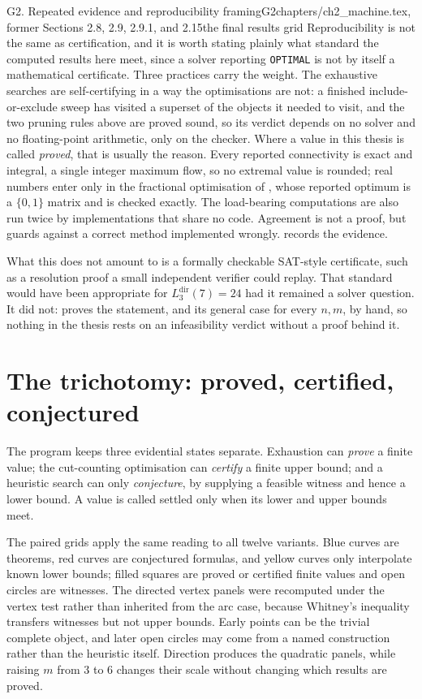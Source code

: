\begin{offcutrewrite}{G2. Repeated evidence and reproducibility framing}{G2}{chapters/ch2\_machine.tex, former Sections 2.8, 2.9, 2.9.1, and 2.15}{the final results grid}
Reproducibility is not the same as certification, and it is worth stating plainly what standard the computed results here meet, since a solver reporting \texttt{OPTIMAL} is not by itself a mathematical certificate. Three practices carry the weight. The exhaustive searches are self-certifying in a way the optimisations are not: a finished include-or-exclude sweep has visited a superset of the objects it needed to visit, and the two pruning rules above are proved sound, so its verdict depends on no solver and no floating-point arithmetic, only on the checker. Where a value in this thesis is called \emph{proved}, that is usually the reason. Every reported connectivity is exact and integral, a single integer maximum flow, so no extremal value is rounded; real numbers enter only in the fractional optimisation of , whose reported optimum is a $\{0,1\}$ matrix and is checked exactly. The load-bearing computations are also run twice by implementations that share no code. Agreement is not a proof, but guards against a correct method implemented wrongly.  records the evidence.

What this does not amount to is a formally checkable SAT-style certificate, such as a resolution proof a small independent verifier could replay. That standard would have been appropriate for $L_3^{\mathrm{dir}}(7)=24$ had it remained a solver question. It did not:  proves the statement, and its general case for every $n,m$, by hand, so nothing in the thesis rests on an infeasibility verdict without a proof behind it.

\section{The trichotomy: proved, certified, conjectured}

The program keeps three evidential states separate. Exhaustion can \emph{prove} a finite value; the cut-counting optimisation can \emph{certify} a finite upper bound; and a heuristic search can only \emph{conjecture}, by supplying a feasible witness and hence a lower bound. A value is called settled only when its lower and upper bounds meet.

The paired grids apply the same reading to all twelve variants. Blue curves are theorems, red curves are conjectured formulas, and yellow curves only interpolate known lower bounds; filled squares are proved or certified finite values and open circles are witnesses. The directed vertex panels were recomputed under the vertex test rather than inherited from the arc case, because Whitney's inequality transfers witnesses but not upper bounds. Early points can be the trivial complete object, and later open circles may come from a named construction rather than the heuristic itself. Direction produces the quadratic panels, while raising $m$ from $3$ to $6$ changes their scale without changing which results are proved.


\end{offcutrewrite}
